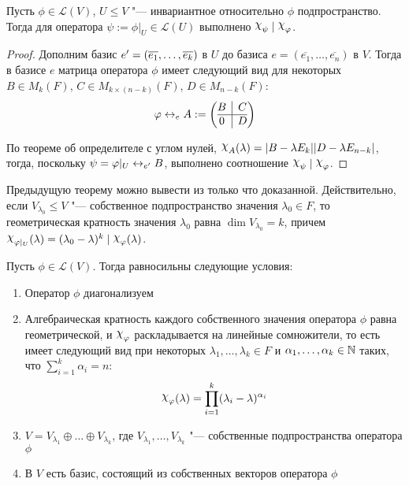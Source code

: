 \begin{theorem}
	Пусть $\phi \in \mathcal{L}(V)$, $U \le V$ "--- инвариантное относительно $\phi$ подпространство. Тогда для оператора $\psi := \phi|_U \in \mathcal{L}(U)$ выполнено $\Chi_\psi \mid \Chi_\phi$.
\end{theorem}

\begin{proof}
	Дополним базис $e' \hm{=} (\overline{e_1}, \dots, \overline{e_k})$ в $U$ до базиса $e = (\overline{e_1}, \dots, \overline{e_n})$ в $V$. Тогда в базисе $e$ матрица оператора $\phi$ имеет следующий вид для некоторых $B \in M_k(F)$, $C \in M_{k \times (n - k)}(F)$, $D \in M_{n - k}(F)$:
	\[\phi \leftrightarrow_e A := \left(\begin{array}{@{}c|c@{}}
		B & C\\
		\hline
		0 & D
	\end{array}\right)\]
	
	По теореме об определителе с углом нулей, $\Chi_A(\lambda) \hm{=} |B - \lambda E_k||D \hm{-} \lambda E_{n - k}|$, тогда, поскольку $\psi \hm{=} \phi|_U \leftrightarrow_{e'} B$, выполнено соотношение $\Chi_\psi\mid \Chi_\phi$.
\end{proof}

\begin{note}
	Предыдущую теорему можно вывести из только что доказанной. Действительно, если $V_{\lambda_0} \le V$ "--- собственное подпространство значения $\lambda_0 \in F$, то геометрическая кратность значения $\lambda_0$ равна $\dim{V_{\lambda_0}} = k$, причем $\Chi_{\phi|_U} (\lambda) = (\lambda_0 - \lambda)^k \mid \Chi_\phi(\lambda)$.
\end{note}

\begin{theorem}
	Пусть $\phi \in \mathcal{L}(V)$. Тогда равносильны следующие условия:
	\begin{enumerate}
		\item Оператор $\phi$ диагонализуем
		
		\item Алгебраическая кратность каждого собственного значения оператора $\phi$ равна геометрической, и $\Chi_\phi$ раскладывается на линейные сомножители, то есть имеет следующий вид при некоторых $\lambda_1, \dotsc, \lambda_k \in F$ и $\alpha_1, \dotsc, \alpha_k \in \mathbb{N}$ таких, что $\sum_{i = 1}^k\alpha_i = n$:
		\[\Chi_\phi(\lambda) = \prod_{i = 1}^k(\lambda_i - \lambda)^{\alpha_i}\]
		
		\item $V = V_{\lambda_1} \oplus \dots \oplus V_{\lambda_k}$, где $V_{\lambda_1}, \dots, V_{\lambda_k}$ "--- собственные подпространства оператора $\phi$
		
		\item В $V$ есть базис, состоящий из собственных векторов оператора $\phi$
	\end{enumerate}
\end{theorem}

